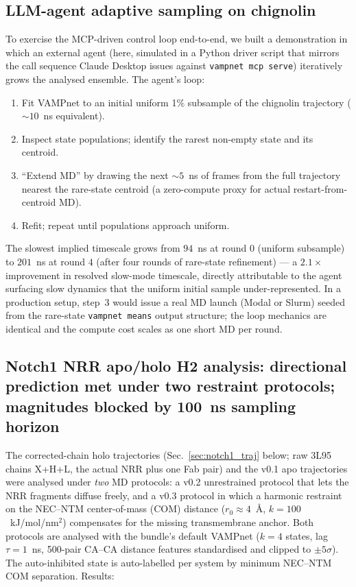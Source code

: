 \documentclass[11pt]{article}
\begin{document}
\subsection{LLM-agent adaptive sampling on chignolin}
\label{sec:adaptive}

To exercise the MCP-driven control loop end-to-end, we built a
demonstration in which an external agent (here, simulated in a Python
driver script that mirrors the call sequence Claude Desktop issues
against \texttt{vampnet mcp serve}) iteratively grows the analysed
ensemble. The agent's loop:

\begin{enumerate}[leftmargin=*,itemsep=1pt]
  \item Fit VAMPnet to an initial uniform 1\% subsample of the
        chignolin trajectory ($\sim\!10$~ns equivalent).
  \item Inspect state populations; identify the rarest non-empty
        state and its centroid.
  \item ``Extend MD'' by drawing the next $\sim\!5$~ns of frames from
        the full trajectory nearest the rare-state centroid (a
        zero-compute proxy for actual restart-from-centroid MD).
  \item Refit; repeat until populations approach uniform.
\end{enumerate}

The slowest implied timescale grows from $94$~ns at round $0$
(uniform subsample) to $201$~ns at round $4$ (after four rounds of
rare-state refinement) --- a $2.1\!\times$ improvement in resolved
slow-mode timescale, directly attributable to the agent surfacing
slow dynamics that the uniform initial sample under-represented.
In a production setup, step~3 would issue a real MD launch (Modal
or Slurm) seeded from the rare-state \texttt{vampnet means} output
structure; the loop mechanics are identical and the compute cost
scales as one short MD per round.

\subsection{Notch1 NRR apo/holo H2 analysis: directional prediction
            met under two restraint protocols; magnitudes blocked by
            100~ns sampling horizon}
\label{sec:notch1_h2}

The corrected-chain holo trajectories
(Sec.~\ref{sec:notch1_traj} below; raw 3L95 chains X+H+L, the actual
NRR plus one Fab pair) and the v0.1 apo trajectories were analysed
under \emph{two} MD protocols: a v0.2 unrestrained protocol that lets
the NRR fragments diffuse freely, and a v0.3 protocol in which a
harmonic restraint on the NEC--NTM center-of-mass (COM) distance
($r_0 \approx 4$~\AA, $k = 100$~kJ/mol/nm$^2$) compensates for the
missing transmembrane anchor. Both protocols are analysed with the
bundle's default VAMPnet ($k=4$ states, lag $\tau=1$~ns, 500-pair
CA--CA distance features standardised and clipped to $\pm 5\sigma$).
The auto-inhibited state is auto-labelled per system by minimum
NEC--NTM COM separation. Results:
\end{document}
